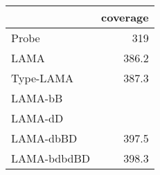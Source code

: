 \begin{center}
\begin{tabular}{lr}
 & coverage\\
\hline
Probe & 319\\
LAMA & 386.2\\
Type-LAMA & 387.3\\
LAMA-bB & \\
LAMA-dD & \\
LAMA-dbBD & 397.5\\
LAMA-bdbdBD & 398.3\\
\end{tabular}
\end{center}

